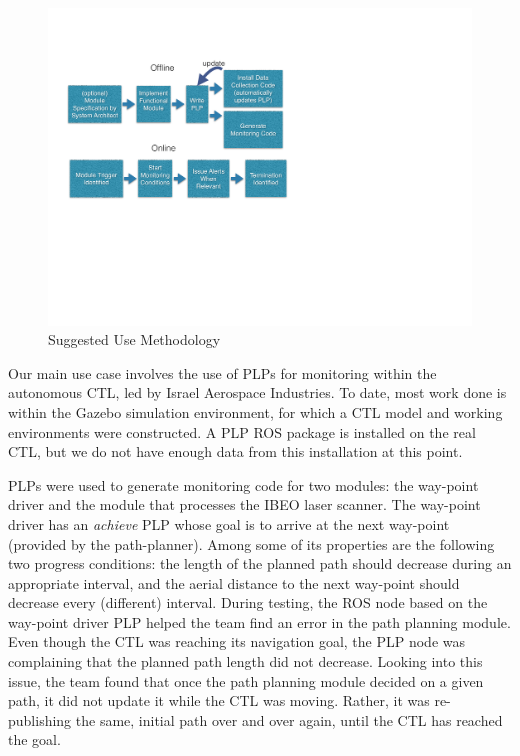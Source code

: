 \documentclass[letterpaper]{article}
\begin{document}
{\begin{figure}[t]
\centering
\includegraphics[scale=0.4]{methodology}
\caption{Suggested Use Methodology}
\label{fig:methodology}
\end{figure}

Our main use case involves the use of PLPs for monitoring within the autonomous CTL, led by Israel Aerospace Industries. To date, most work done is within the Gazebo simulation environment, for which a CTL model and working environments were constructed. A PLP ROS package is installed on the real  CTL, but we do not have enough data from this installation at this point.

PLPs were used to generate monitoring
code for two modules: the way-point driver and the module that processes the IBEO laser scanner. The way-point driver has an
{\em achieve} PLP whose goal is to arrive at the next way-point (provided by the path-planner). Among some of its properties are the following two
progress conditions: the length of the planned path should decrease during an appropriate interval, and
the aerial distance to the next way-point should decrease every
(different) interval.
During testing, the ROS node based on the way-point driver PLP helped the team find an error in the path planning module. Even though the CTL was reaching its navigation goal, the PLP node was complaining that the planned path length did not decrease. Looking into this issue, the team found that once the path planning module decided on a given path, it did not update it while the CTL was moving. Rather, it was re-publishing the same, initial path over and over again, until the CTL has reached the goal.

}
\end{document}
